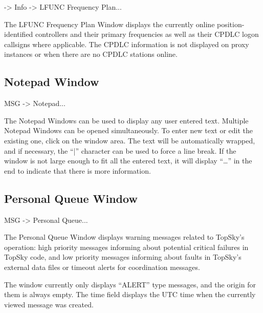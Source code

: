 \documentclass[a4paper,oneside,11pt]{memoir}
\begin{document}
 -> Info -> LFUNC Frequency Plan...

\bigskip


The LFUNC Frequency Plan Window displays the currently online position-identified controllers and their primary frequencies as well as their CPDLC logon callsigns where applicable. The CPDLC information is not displayed on proxy instances or when there are no CPDLC stations online.

\subsection{Notepad Window}
\label{win:note}

 MSG -> Notepad...

\bigskip


The Notepad Windows can be used to display any user entered text. Multiple Notepad Windows can be opened simultaneously. To enter new text or edit the existing one, click on the window area. The text will be automatically wrapped, and if necessary, the “|” character can be used to force a line break. If the window is not large enough to fit all the entered text, it will display “…” in the end to indicate that there is more information.

\subsection{Personal Queue Window}
\label{win:pqw}

 MSG -> Personal Queue...

\bigskip


The Personal Queue Window displays warning messages related to TopSky’s operation: high priority messages informing about potential critical failures in TopSky code, and low priority messages informing about faults in TopSky’s external data files or timeout alerts for coordination messages.

\bigskip

The window currently only displays “ALERT” type messages, and the origin for them is always empty. The time field displays the UTC time when the currently viewed message was created.

\bigskip
\end{document}
